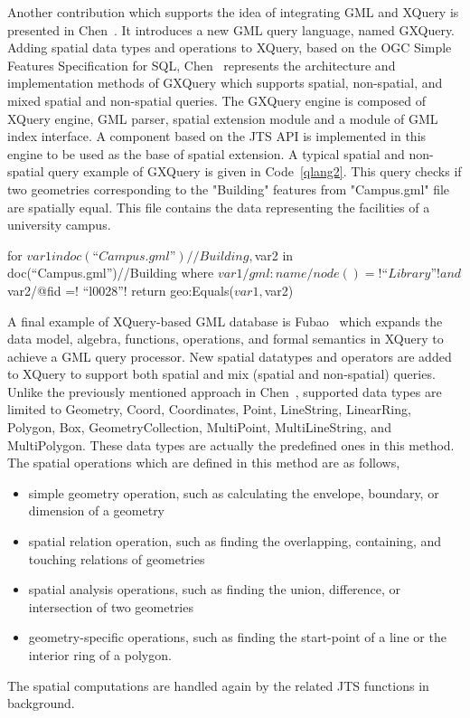 \documentclass[a4paper,12pt]{article}
\begin{document}
Another contribution which supports the idea of integrating GML and XQuery is presented in Chen~\cite{Chen2010}.
It introduces a new GML query language, named GXQuery. 
Adding spatial data types and operations to XQuery, based on the OGC Simple Features Specification for SQL, 
Chen~\cite{Chen2010} represents the architecture and implementation methods of GXQuery 
which supports spatial, non-spatial, and mixed spatial and non-spatial queries. 
The GXQuery engine is composed of XQuery engine, GML parser, spatial extension module 
and a module of GML index interface. 
A component based on the JTS API is implemented in this engine
to be used as the base of spatial extension. 
A typical spatial and non-spatial query example of GXQuery is given in Code~\ref{qlang2}.
This query checks if two geometries corresponding to the "Building" features from 
"Campus.gml" file are spatially equal. This file contains the data representing
the facilities of a university campus.
\vspace{10px}
\begin{fakeXML}[escapechar=\!,label=qlang2,caption=A typical example of combined spatial and non-spatial query in GXQuery.]
for $var1 in doc(“Campus.gml”)//Building,
    $var2 in doc(“Campus.gml”)//Building
where 
    $var1/gml:name/node()=! “Library”! and $var2/@fid =! “l0028”! 
return geo:Equals($var1, $var2)
\end{fakeXML}
\vspace{10px}

A final example of XQuery-based GML database is Fubao~\cite{Fubao2010}
which expands the data model, algebra, functions, operations, and formal semantics in XQuery 
to achieve a GML query processor. New spatial datatypes and operators are added to XQuery to support both spatial and mix (spatial and non-spatial) queries. Unlike the previously mentioned approach in Chen~\cite{Chen2010}, supported data types are limited to Geometry, Coord, Coordinates, Point, LineString, LinearRing, Polygon, Box, GeometryCollection, MultiPoint, MultiLineString, and MultiPolygon. 
These data types are actually the predefined ones in this method.
The spatial operations which are defined in this method are as follows,
\begin{itemize}
\item simple geometry operation, such as calculating the envelope, boundary, or dimension of a geometry
\item spatial relation operation, such as finding the overlapping, containing, and touching relations of geometries
\item spatial analysis operations, such as finding the union, difference, or intersection of two geometries
\item geometry-specific operations, such as finding the start-point of a line or the interior ring of a polygon.
\end{itemize}
The spatial computations are handled again by the related JTS functions in background.
\end{document}
